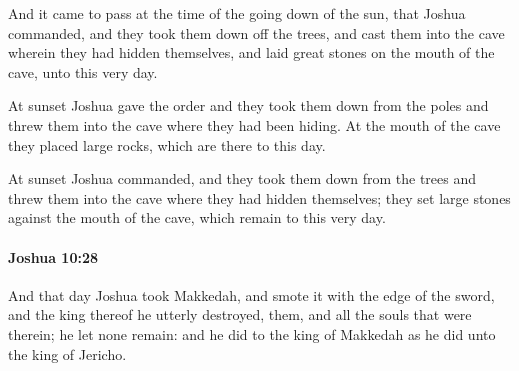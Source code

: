 			\begin{versebox}
					\item[BHS] 
					\item[ASV] And it came to pass at the time of the going down of the sun, that Joshua commanded, and they took them down off the trees, and cast them into the cave wherein they had hidden themselves, and laid great stones on the mouth of the cave, unto this very day.
					\item[NIV] At sunset Joshua gave the order and they took them down from the poles and threw them into the cave where they had been hiding. At the mouth of the cave they placed large rocks, which are there to this day.
					\item[NRSV] At sunset Joshua commanded, and they took them down from the trees and threw them into the cave where they had hidden themselves; they set large stones against the mouth of the cave, which remain to this very day.
			\end{versebox}

		\paragraph{Joshua 10:28} %
			\label{JOSHUA-10-28}

			And that day Joshua took Makkedah, and smote it with the edge of the sword, and the king thereof he utterly destroyed, them, and all the souls that were therein; he let none remain: and he did to the king of Makkedah as he did unto the king of Jericho.

